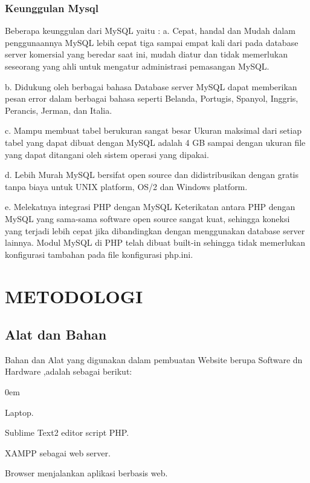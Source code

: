 \documentclass{jtetiproposalskripsi}
\begin{document}
\subsection{Keunggulan Mysql}
Beberapa keunggulan dari MySQL yaitu : 
a. Cepat, handal dan Mudah dalam penggunaannya 
MySQL lebih cepat tiga sampai empat kali dari pada database server 
komersial yang beredar saat ini, mudah diatur dan tidak memerlukan 
seseorang yang ahli untuk mengatur administrasi pemasangan MySQL. 

b. Didukung oleh berbagai bahasa 
Database server MySQL dapat memberikan pesan error dalam berbagai bahasa seperti Belanda, Portugis, Spanyol, Inggris, Perancis, Jerman, dan Italia. 

c. Mampu membuat tabel berukuran sangat besar 
Ukuran maksimal dari setiap tabel yang dapat dibuat dengan MySQL 
adalah 4 GB sampai dengan ukuran file yang dapat ditangani oleh sistem operasi yang dipakai. 

d. Lebih Murah 
MySQL bersifat open source dan didistribusikan dengan gratis tanpa 
biaya untuk UNIX platform, OS/2 dan Windows platform.  

e. Melekatnya integrasi PHP dengan MySQL 
Keterikatan antara PHP dengan MySQL yang sama-sama software open source sangat kuat, sehingga koneksi yang terjadi lebih cepat jika 
dibandingkan dengan menggunakan database server lainnya. Modul 
MySQL di PHP telah dibuat built-in sehingga tidak memerlukan 
konfigurasi tambahan pada file konfigurasi php.ini.



\chapter{METODOLOGI}

\section{Alat dan Bahan}
Bahan dan Alat yang digunakan dalam pembuatan Website berupa Software dn Hardware ,adalah sebagai berikut:

\vspace{-0.5cm}

\begin{enumerate}[a.]
\begin{singlespace}
\itemsep0em
\item Laptop.
\item Sublime Text2 editor script PHP.
\item XAMPP sebagai web server.
\item Browser menjalankan aplikasi berbasis web.

\end{singlespace}
\end{enumerate}
\end{document}
